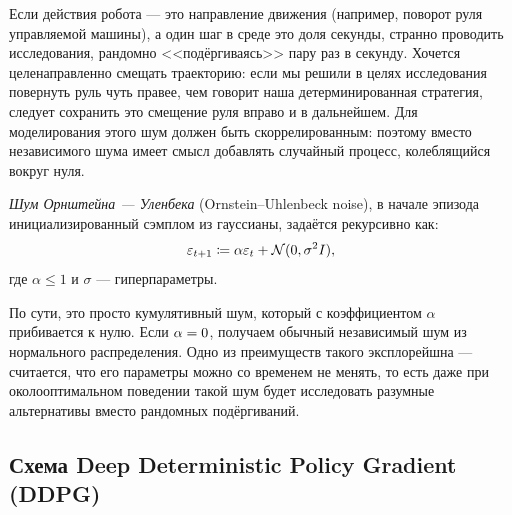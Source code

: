 \begin{example}
Если действия робота --- это направление движения (например, поворот руля управляемой машины), а один шаг в среде это доля секунды, странно проводить исследования, рандомно <<подёргиваясь>> пару раз в секунду. Хочется целенаправленно смещать траекторию: если мы решили в целях исследования повернуть руль чуть правее, чем говорит наша детерминированная стратегия, следует сохранить это смещение руля вправо и в дальнейшем. Для моделирования этого шум должен быть скоррелированным: поэтому вместо независимого шума имеет смысл добавлять случайный процесс, колеблящийся вокруг нуля.
\end{example}

\begin{definition}
\emph{Шум Орнштейна — Уленбека} (Ornstein–Uhlenbeck noise), в начале эпизода инициализированный сэмплом из гауссианы, задаётся рекурсивно как:
$$\varepsilon_{t + 1} \coloneqq \alpha \varepsilon_t + \mathcal{N}(0, \sigma^2I),$$
где $\alpha \le 1$ и $\sigma$ --- гиперпараметры.
\end{definition}

По сути, это просто кумулятивный шум, который с коэффициентом $\alpha$ прибивается к нулю. Если $\alpha \HM= 0$, получаем обычный независимый шум из нормального распределения. Одно из преимуществ такого эксплорейшна --- считается, что его параметры можно со временем не менять, то есть даже при околооптимальном поведении такой шум будет исследовать разумные альтернативы вместо рандомных подёргиваний.

\subsection{Схема Deep Deterministic Policy Gradient (DDPG)}

